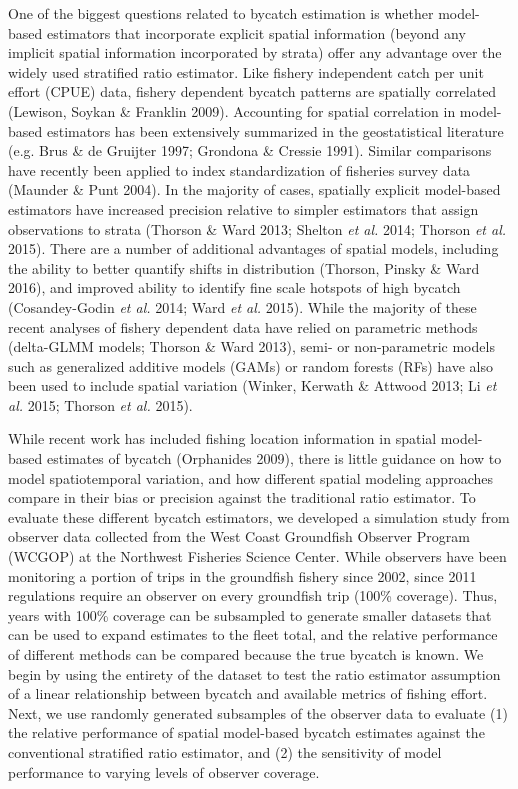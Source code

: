 \documentclass[]{article}
\begin{document}
One of the biggest questions related to bycatch estimation is whether
model-based estimators that incorporate explicit spatial information
(beyond any implicit spatial information incorporated by strata) offer
any advantage over the widely used stratified ratio estimator. Like
fishery independent catch per unit effort (CPUE) data, fishery dependent
bycatch patterns are spatially correlated (Lewison, Soykan \& Franklin
2009). Accounting for spatial correlation in model-based estimators has
been extensively summarized in the geostatistical literature (e.g. Brus
\& de Gruijter 1997; Grondona \& Cressie 1991). Similar comparisons have
recently been applied to index standardization of fisheries survey data
(Maunder \& Punt 2004). In the majority of cases, spatially explicit
model-based estimators have increased precision relative to simpler
estimators that assign observations to strata (Thorson \& Ward 2013;
Shelton \emph{et al.} 2014; Thorson \emph{et al.} 2015). There are a
number of additional advantages of spatial models, including the ability
to better quantify shifts in distribution (Thorson, Pinsky \& Ward
2016), and improved ability to identify fine scale hotspots of high
bycatch (Cosandey-Godin \emph{et al.} 2014; Ward \emph{et al.} 2015).
While the majority of these recent analyses of fishery dependent data
have relied on parametric methods (delta-GLMM models; Thorson \& Ward
2013), semi- or non-parametric models such as generalized additive
models (GAMs) or random forests (RFs) have also been used to include
spatial variation (Winker, Kerwath \& Attwood 2013; Li \emph{et al.}
2015; Thorson \emph{et al.} 2015).

While recent work has included fishing location information in spatial
model-based estimates of bycatch (Orphanides 2009), there is little
guidance on how to model spatiotemporal variation, and how different
spatial modeling approaches compare in their bias or precision against
the traditional ratio estimator. To evaluate these different bycatch
estimators, we developed a simulation study from observer data collected
from the West Coast Groundfish Observer Program (WCGOP) at the Northwest
Fisheries Science Center. While observers have been monitoring a portion
of trips in the groundfish fishery since 2002, since 2011 regulations
require an observer on every groundfish trip (100\% coverage). Thus,
years with 100\% coverage can be subsampled to generate smaller datasets
that can be used to expand estimates to the fleet total, and the
relative performance of different methods can be compared because the
true bycatch is known. We begin by using the entirety of the dataset to
test the ratio estimator assumption of a linear relationship between
bycatch and available metrics of fishing effort. Next, we use randomly
generated subsamples of the observer data to evaluate (1) the relative
performance of spatial model-based bycatch estimates against the
conventional stratified ratio estimator, and (2) the sensitivity of
model performance to varying levels of observer coverage.
\end{document}
